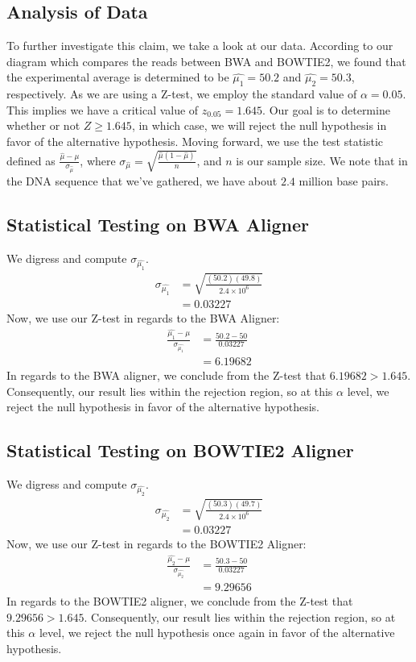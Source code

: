 \documentclass[12pt]{article}
\let\ds\displaystyle
\begin{document}
\subsection{Analysis of Data}
{To further investigate this claim, we take a look at our data. According to our diagram which compares the reads between BWA and BOWTIE2, we found that the experimental average is determined to be $\hat{\mu_1}=50.2$ and $\hat{\mu_2}=50.3$, respectively. As we are using a Z-test, we employ the standard value of $\alpha = 0.05$. This implies we have a critical value of $z_{0.05}=1.645$. Our goal is to determine whether or not $Z\geq 1.645$, in which case, we will reject the null hypothesis in favor of the alternative hypothesis. Moving forward, we use the test statistic defined as $\ds{\frac{\hat{\mu}-\mu}{\sigma_{\hat{\mu}}}}$, where $\sigma_{\hat{\mu}}=\ds{\sqrt{\frac{\hat{\mu}(1-\hat{\mu})}{n}}}$, and $n$ is our sample size. We note that in the DNA sequence that we've gathered, we have about $2.4$ million base pairs.}

\newpage

\subsection{Statistical Testing on BWA Aligner}
{We digress and compute $\sigma_{\hat{\mu_1}}$. \newline
\begin{align*}
\sigma_{\hat{\mu_1}} &= \ds{\sqrt{\frac{(50.2)(49.8)}{2.4\times 10^6}}}\\
&= 0.03227
\end{align*}
Now, we use our Z-test in regards to the BWA Aligner:
\begin{align*}
\ds{\frac{\hat{\mu_1}-\mu}{\sigma_{\hat{\mu_1}}}} &= \ds{\frac{50.2-50}{0.03227}}\\
&= 6.19682
\end{align*}
In regards to the BWA aligner, we conclude from the Z-test that $6.19682 > 1.645$. Consequently, our result lies within the rejection region, so at this $\alpha$ level, we reject the null hypothesis in favor of the alternative hypothesis.
}

\subsection{Statistical Testing on BOWTIE2 Aligner}
{We digress and compute $\sigma_{\hat{\mu_2}}$. \newline
\begin{align*}
\sigma_{\hat{\mu_2}} &= \ds{\sqrt{\frac{(50.3)(49.7)}{2.4\times 10^6}}}\\
&= 0.03227
\end{align*}
Now, we use our Z-test in regards to the BOWTIE2 Aligner:
\begin{align*}
\ds{\frac{\hat{\mu_2}-\mu}{\sigma_{\hat{\mu_2}}}} &= \ds{\frac{50.3-50}{0.03227}}\\
&= 9.29656
\end{align*}
In regards to the BOWTIE2 aligner, we conclude from the Z-test that $9.29656 > 1.645$. Consequently, our result lies within the rejection region, so at this $\alpha$ level, we reject the null hypothesis once again in favor of the alternative hypothesis.
}
\end{document}
